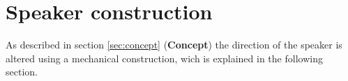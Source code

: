 \chapter{Speaker construction}
%
As described in section \ref{sec:concept} (\textbf{Concept}) the direction of the speaker is altered using a mechanical construction, wich is explained in the following section.
%

